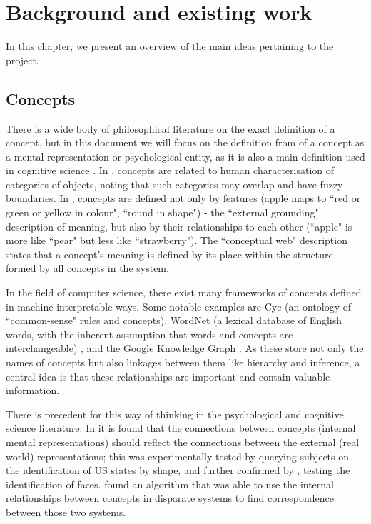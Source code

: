 \chapter{Background and existing work}

In this chapter, we present an overview of the main ideas pertaining to the project. 

\section{Concepts}

There is a wide body of philosophical literature on the exact definition of a concept, but in this document we will focus on the definition from \cite{stanfordconcepts} of a concept as a mental representation or psychological entity, as it is also a main definition used in cognitive science \cite{Pinker2007}. In \cite{NatureOfHumanConcepts}, concepts are related to human characterisation of categories of objects, noting that such categories may overlap and have fuzzy boundaries. In \cite{GOLDSTONE2002295}, concepts are defined not only by features (apple maps to ``red or green or yellow in colour", ``round in shape") - the ``external grounding" description of meaning, but also by their relationships to each other (``apple" is more like ``pear" but less like ``strawberry"). The ``conceptual web" description states that a concept's meaning is defined by its place within the structure formed by all concepts in the system. 

In the field of computer science, there exist many frameworks of concepts defined in machine-interpretable ways. Some notable examples are Cyc \cite{Cyc} (an ontology of ``common-sense" rules and concepts), WordNet (a lexical database of English words, with the inherent assumption that words and concepts are interchangeable) \cite{WordNet}, and the Google Knowledge Graph \cite{KnowledgeGraphs}. As these store not only the names of concepts but also linkages between them like hierarchy and inference, a central idea is that these relationships are important and contain valuable information. 

There is precedent for this way of thinking in the psychological and cognitive science literature. In \cite{SHEPARD19701} it is found that the connections between concepts (internal mental representations) should reflect the connections between the external (real world) representations; this was experimentally tested by querying subjects on the identification of US states by shape, and further confirmed by \cite{SecondOrderIsomorphismFaces}, testing the identification of faces. \cite{GOLDSTONE2002295} found an algorithm that was able to use the internal relationships between concepts in disparate systems to find correspondence between those two systems. 

